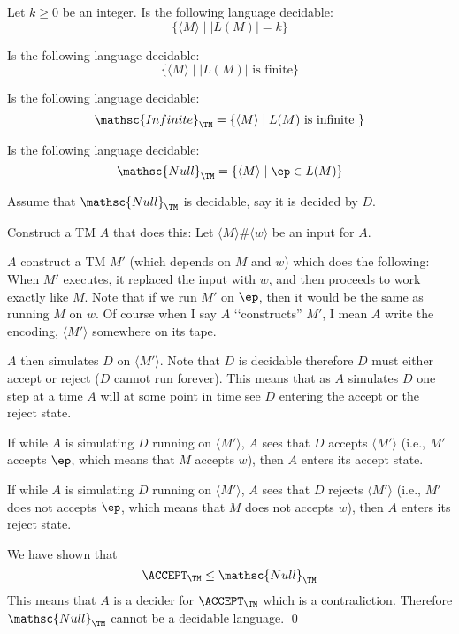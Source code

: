 \newpage
\begin{ex}
Let $k \geq 0$ be an integer.
Is the following language decidable:
\[
\{ \langle M \rangle \mid |L(M)| = k \}
\]
\end{ex}


\newpage
\begin{ex}
Is the following language decidable:
\[
\{ \langle M \rangle \mid |L(M)| \text{ is finite} \}
\]
\end{ex}




\newpage
\newcommand\INFINITE{\mathsc{Infinite}}
\begin{ex}
Is the following language decidable:
\[
\INFINITE_\TM = \{ \langle M \rangle \mid L(M) \text{ is infinite } \}
\]
\end{ex}


\newpage
\newcommand\Null{\mathsc{Null}}
\begin{ex}
Is the following language decidable:
\[
\Null_\TM = \{ \langle M \rangle \mid \ep \in L(M) \}
\]
\end{ex}


\newpage
\SOLUTION

Assume that $\Null_\TM$ is decidable, say it is decided by $D$.

Construct a TM $A$ that does this:
Let $\langle M \rangle \# \langle w \rangle$ be an input for $A$.
\begin{tightlist}
  \item $A$ construct a TM $M'$ (which depends on $M$ and $w$)
  which does the following:
  When $M'$ executes, it replaced the input with $w$,
  and then proceeds to
  work exactly like $M$.
  Note that if we run $M'$ on $\ep$, then it would be the
  same as running $M$ on $w$.
  Of course when I say $A$ \lq\lq constructs'' $M'$, I  mean $A$ write
  the encoding, $\langle M'\rangle$ somewhere on its tape.
  \item
  $A$ then simulates $D$ on $\langle M' \rangle$.
  Note that $D$ is decidable therefore $D$ must either accept or reject
  ($D$ cannot run forever).
  This means that as $A$ simulates $D$ one step at a time
  $A$ will at some point in time see $D$ entering the
  accept or the reject state.
  \item If while $A$ is simulating $D$ running on $\langle M'\rangle$,
  $A$ sees that $D$ accepts $\langle M' \rangle$ (i.e., 
  $M'$ accepts $\ep$, which means that $M$ accepts $w$), then
  $A$ enters its accept state.
  \item If while $A$ is simulating $D$ running on $\langle M'\rangle$,
  $A$ sees that $D$ rejects $\langle M' \rangle$ (i.e., 
  $M'$ does not accepts $\ep$, which means that $M$ does not
  accepts $w$), then
  $A$ enters its reject state.
  \end{tightlist}
We have shown that
\[
\ACCEPT_\TM \leq \Null_\TM
\]
This means that $A$ is a decider for $\ACCEPT_\TM$ which is a contradiction.
Therefore $\Null_\TM$ cannot be a decidable language.
\qed

